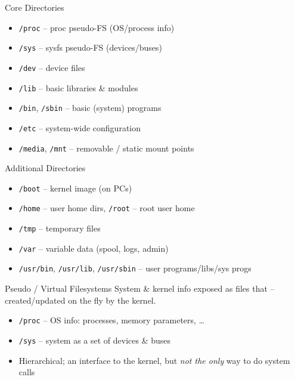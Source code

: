 

\begin{definition}{Core Directories}
    \begin{itemize}
        \item \texttt{/proc} -- proc pseudo-FS (OS/process info)
        \item \texttt{/sys} -- sysfs pseudo-FS (devices/buses)
        \item \texttt{/dev} -- device files
        \item \texttt{/lib} -- basic libraries \& modules
        \item \texttt{/bin}, \texttt{/sbin} -- basic (system) programs
        \item \texttt{/etc} -- system-wide configuration
        \item \texttt{/media}, \texttt{/mnt} -- removable / static mount points
    \end{itemize}
\end{definition}

\begin{definition}{Additional Directories}
    \begin{itemize}
        \item \texttt{/boot} -- kernel image (on PCs)
        \item \texttt{/home} -- user home dirs, \texttt{/root} -- root user home
        \item \texttt{/tmp} -- temporary files
        \item \texttt{/var} -- variable data (spool, logs, admin)
        \item \texttt{/usr/bin}, \texttt{/usr/lib}, \texttt{/usr/sbin} -- user programs/libs/sys progs
    \end{itemize}
\end{definition}

\multend

\begin{concept}{Pseudo / Virtual Filesystems}
    System \& kernel info exposed as files that  -- created/updated on the fly by the kernel.
    \begin{itemize}
        \item \texttt{/proc} -- OS info: processes, memory parameters, \dots
        \item \texttt{/sys} -- system as a set of devices \& buses
        \item Hierarchical; an interface to the kernel, but \emph{not the only} way
              to do system calls
    \end{itemize}
\end{concept}


